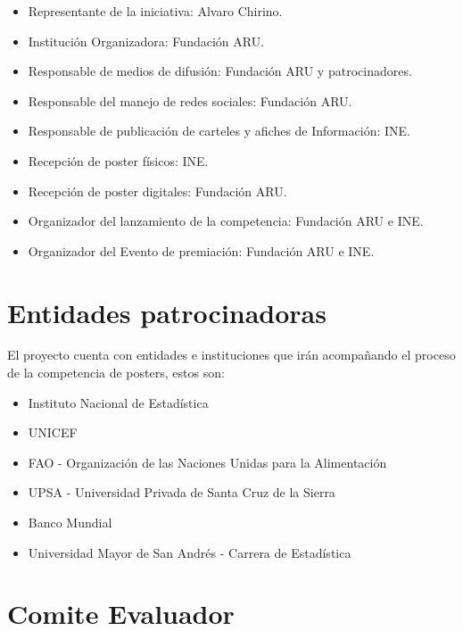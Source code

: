 \documentclass{article}
\begin{document}
\begin{itemize}
\item Representante de la iniciativa: Alvaro Chirino.  
\item Institución Organizadora: Fundación ARU.
\item Responsable de medios de difusión:  Fundación ARU y patrocinadores. 
\item Responsable del manejo de redes sociales: Fundación ARU.
\item Responsable de publicación de carteles y afiches de Información: INE.
\item Recepción de poster físicos: INE.
\item Recepción de poster digitales: Fundación ARU.
\item Organizador del lanzamiento de la competencia: Fundación ARU e INE.
\item Organizador del Evento de premiación: Fundación ARU e INE.
\end{itemize}

\section{Entidades patrocinadoras}

El proyecto cuenta con entidades e instituciones que irán acompañando el proceso de la competencia de posters, estos son:

\begin{itemize}
\item Instituto Nacional de Estadística 
\item UNICEF
\item FAO - Organización de las Naciones Unidas para la Alimentación
\item UPSA - Universidad Privada de Santa Cruz de la Sierra
\item Banco Mundial
\item Universidad Mayor de San Andrés - Carrera de Estadística
\end{itemize}

\section{Comite Evaluador}
\end{document}
